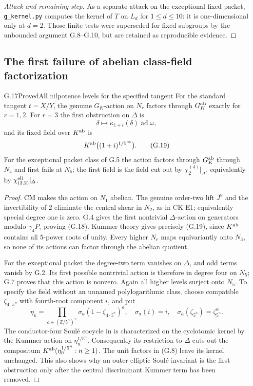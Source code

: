 \begin{proof}[Attack and remaining step]
As a separate attack on the exceptional fixed
packet, \texttt{g\_kernel.py} computes the kernel of $T$ on
$L_d$ for $1\le d\le10$: it is one-dimensional only at $d=2$.
Those finite tests were superseded for fixed subgroups by the
unbounded argument G.8--G.10, but are retained as reproducible
evidence.
\end{proof}



\subsection{The first failure of abelian class-field factorization}

\begin{statement}{G.17}{Proved}{All nilpotence levels for the specified tangent}
For the standard tangent $t=X/Y$, the genuine $G_K$-action on
$N_r$ factors through $G_K^{\rm ab}$ exactly for $r=1,2$.
For $r=3$ the first obstruction on $\Delta$ is
\[
 \delta\longmapsto\kappa_{1+i}(\delta)\operatorname{ad}\omega,
 \tag{G.18}
\]
and its fixed field over $K^{\rm ab}$ is
\[
       K^{\rm ab}\bigl((1+i)^{1/5^\infty}\bigr).
 \tag{G.19}
\]
For the exceptional packet class of G.5 the action factors
through $G_K^{\rm ab}$ through $N_4$ and first fails at $N_5$;
the first field is the field cut out by
$\chi^{(4)}_2|_\Delta$, equivalently by
$\chi^{\rm ell}_{(2,2)}|_\Delta$.
\end{statement}
\begin{proof}
CM makes the action on $N_1$ abelian. The genuine order-two
lift $J^2$ and the invertibility of $2$ eliminate the central
shear in $N_2$, as in CK E1; equivalently special degree one
is zero. G.4 gives the first nontrivial $\Delta$-action on
generators modulo $\gamma_4P$, proving (G.18). Kummer theory
gives precisely (G.19), since $K^{\rm ab}$ contains all
$5$-power roots of unity. Every higher $N_r$ maps
equivariantly onto $N_3$, so none of its actions can factor
through the abelian quotient.

For the exceptional packet the degree-two term vanishes on
$\Delta$, and odd terms vanish by G.2. Its first possible
nontrivial action is therefore in degree four on $N_5$;
G.7 proves that this action is nonzero. Again all higher
levels surject onto $N_5$. To specify the field without an
unnamed polylogarithmic class, choose compatible
$\zeta_{4\cdot5^n}$ with fourth-root component $i$, and put
\[
 \eta_n=\prod_{a\in(\mathbb Z/5^n)^\times}
          \sigma_a(1-\zeta_{4\cdot5^n})^a,
 \quad
 \sigma_a(i)=i,\quad
 \sigma_a(\zeta_{5^n})=\zeta_{5^n}^{a}.
\]
The conductor-four Soul\'e cocycle in
\citet[Definition 2.14 and Remark 2.15(2)]{IshiiGoto2026}
is characterized on the cyclotomic kernel by the Kummer
action on $\eta_n^{1/5^n}$. Consequently its restriction
to $\Delta$ cuts out the compositum
$K^{\rm ab}(\eta_n^{1/5^n}:n\ge1)$. The unit factors in
(G.8) leave its kernel unchanged. This also shows why an
outer elliptic Soul\'e invariant is the first obstruction
only after the central discriminant Kummer term has been
removed.
\end{proof}

